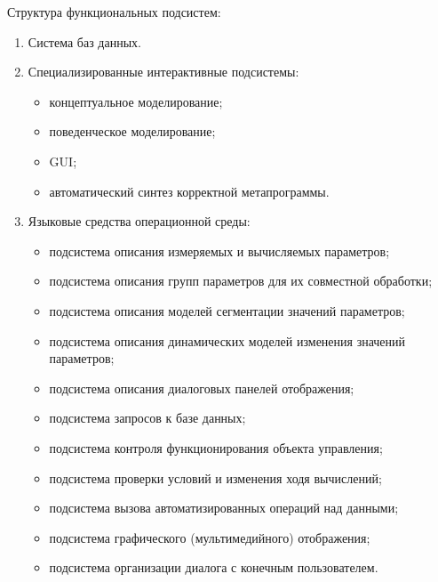 Структура функциональных подсистем:
\begin{enumerate}
\item Система баз данных.
\item Специализированные интерактивные подсистемы:
  \begin{itemize}
  \item концептуальное моделирование;
  \item поведенческое моделирование;
  \item GUI;
  \item автоматический синтез корректной метапрограммы.
  \end{itemize}
\item Языковые средства операционной среды:
  \begin{itemize}
  \item подсистема описания измеряемых и вычисляемых параметров;
  \item подсистема описания групп параметров для их совместной
    обработки;
  \item подсистема описания моделей сегментации значений параметров;
  \item подсистема описания динамических моделей изменения значений
    параметров;
  \item подсистема описания диалоговых панелей отображения;
  \item подсистема запросов к базе данных;
  \item подсистема контроля функционирования объекта управления;
  \item подсистема проверки условий и изменения ходя вычислений;
  \item подсистема вызова автоматизированных операций над данными;
  \item подсистема графического (мультимедийного) отображения;
  \item подсистема организации диалога с конечным пользователем.
  \end{itemize}
\end{enumerate}
